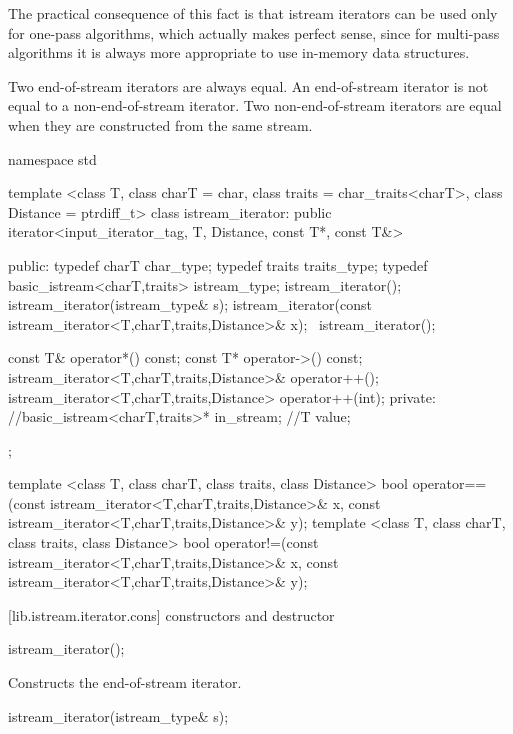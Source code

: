 \pnum
The practical consequence of this fact is that istream iterators can be used
only for one-pass algorithms, which actually makes perfect sense, since for
multi-pass algorithms it is always more appropriate to use in-memory data
structures.

\pnum
Two end-of-stream iterators are always equal.
An end-of-stream iterator is not
equal to a non-end-of-stream iterator.
Two non-end-of-stream iterators are equal when they are constructed from the same stream.

\begin{codeblock}
namespace std {
  template <class T, class charT = char, class traits = char_traits<charT>,
      class Distance = ptrdiff_t>
  class istream_iterator:
    public iterator<input_iterator_tag, T, Distance, const T*, const T&> {
  public:
    typedef charT char_type;
    typedef traits traits_type;
    typedef basic_istream<charT,traits> istream_type;
    istream_iterator();
    istream_iterator(istream_type& s);
    istream_iterator(const istream_iterator<T,charT,traits,Distance>& x);
   ~istream_iterator();

    const T& operator*() const;
    const T* operator->() const;
    istream_iterator<T,charT,traits,Distance>& operator++();
    istream_iterator<T,charT,traits,Distance>  operator++(int);
  private:
    //basic_istream<charT,traits>* in_stream; \expos
    //T value;                                \expos
  };

  template <class T, class charT, class traits, class Distance>
    bool operator==(const istream_iterator<T,charT,traits,Distance>& x,
                    const istream_iterator<T,charT,traits,Distance>& y);
  template <class T, class charT, class traits, class Distance>
    bool operator!=(const istream_iterator<T,charT,traits,Distance>& x,
                    const istream_iterator<T,charT,traits,Distance>& y);
}
\end{codeblock}

[lib.istream.iterator.cons]{ constructors and destructor}


%
\begin{itemdecl}
istream_iterator();
\end{itemdecl}

\begin{itemdescr}
\pnum
\effects
Constructs the end-of-stream iterator.
\end{itemdescr}


%
\begin{itemdecl}
istream_iterator(istream_type& s);
\end{itemdecl}


